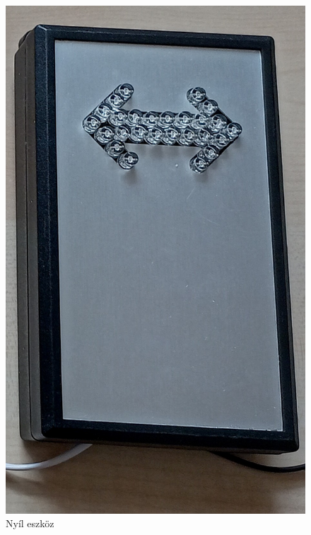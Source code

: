 \documentclass[tocnopagenum]{thesis-ekf}
\theoremstyle{definition}
\theoremstyle{remark}
\begin{document}
	\begin{figure}[h!]
		\centering
		\includegraphics[scale=0.1]{images/foto_nyil.jpg}
		\caption{Nyíl eszköz}
		\label{fig:foto_nyil}
	\end{figure}
\end{document}
